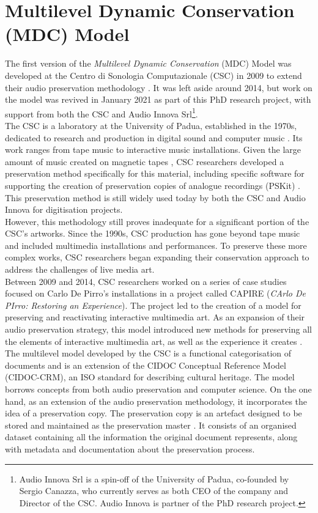 \section{Multilevel Dynamic Conservation (MDC) Model}
The first version of the \textit{Multilevel Dynamic Conservation} (MDC) Model was developed at the Centro di Sonologia Computazionale (CSC) in 2009 to extend their audio preservation methodology \cite{bressan2016atr, fantozzi2017tape, pretto2019computing}. It was left aside around 2014, but work on the model was revived in January 2021 as part of this PhD research project, with support from both the CSC and Audio Innova Srl\footnote{Audio Innova Srl is a spin-off of the University of Padua, co-founded by Sergio Canazza, who currently serves as both CEO of the company and Director of the CSC. Audio Innova is partner of the PhD research project.}.\\
The CSC is a laboratory at the University of Padua, established in the 1970s, dedicated to research and production in digital sound and computer music \cite{canazza2019four, canazza2022gesture}. Its work ranges from tape music to interactive music installations. Given the large amount of music created on magnetic tapes \cite{pretto2020active}, CSC researchers developed a preservation method specifically for this material, including specific software for supporting the creation of preservation copies of analogue recordings (PSKit) \cite{fantozzi2017tape}. This preservation method is still widely used today by both the CSC and Audio Innova for digitisation projects.\\
However, this methodology still proves inadequate for a significant portion of the CSC's artworks. Since the 1990s, CSC production has gone beyond tape music and included multimedia installations and performances. To preserve these more complex works, CSC researchers began expanding their conservation approach to address the challenges of live media art.\\
Between 2009 and 2014, CSC researchers worked on a series of case studies focused on Carlo De Pirro’s installations in a project called CAPIRE (\textit{CArlo De PIrro: Restoring an Experience}). The project led to the creation of a model for preserving and reactivating interactive multimedia art. As an expansion of their audio preservation strategy, this model introduced new methods for preserving all the elements of interactive multimedia art, as well as the experience it creates \cite{bressan2014challenge}.\\
The multilevel model developed by the CSC is a functional categorisation of documents and is an extension of the CIDOC Conceptual Reference Model (CIDOC-CRM), an ISO standard for describing cultural heritage. The model borrows concepts from both audio preservation and computer science. On the one hand, as an extension of the audio preservation methodology, it incorporates the idea of a preservation copy. The preservation copy is an artefact designed to be stored and maintained as the preservation master \cite{miliano1999iasa}. It consists of an organised dataset containing all the information the original document represents, along with metadata and documentation about the preservation process.\\
